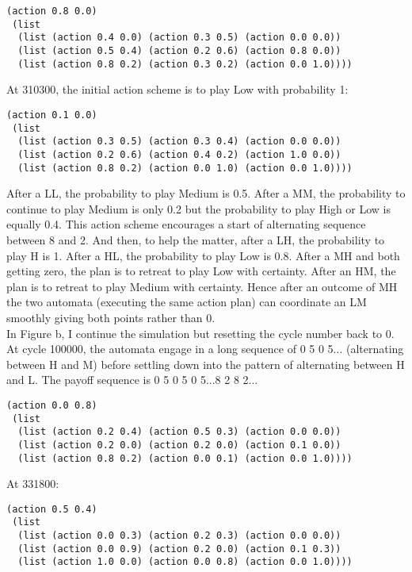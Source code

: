 \documentclass[12.5pt]{report}
\begin{document}
\begin{verbatim}
(action 0.8 0.0)
 (list
  (list (action 0.4 0.0) (action 0.3 0.5) (action 0.0 0.0))
  (list (action 0.5 0.4) (action 0.2 0.6) (action 0.8 0.0))
  (list (action 0.8 0.2) (action 0.3 0.2) (action 0.0 1.0))))
\end{verbatim}

At 310300, the initial action scheme is to play Low with probability 1:

\begin{verbatim}
(action 0.1 0.0)
 (list
  (list (action 0.3 0.5) (action 0.3 0.4) (action 0.0 0.0))
  (list (action 0.2 0.6) (action 0.4 0.2) (action 1.0 0.0))
  (list (action 0.8 0.2) (action 0.0 1.0) (action 0.0 1.0))))

\end{verbatim}
After a LL, the probability to play Medium is 0.5. After a MM, the probability to continue to play Medium is only 0.2 but the probability to play High or Low is equally 0.4. This action scheme encourages a start of alternating sequence between 8 and 2. And then, to help the matter, after a LH, the probability to play H is 1. After a HL, the probability to play Low is 0.8. After a MH and both getting zero, the plan is to retreat to play Low with certainty. After an HM, the plan is to retreat to play Medium with certainty. Hence after an outcome of MH the two automata (executing the same action plan) can coordinate an LM smoothly giving both points rather than 0.\\

In Figure b, I continue the simulation but resetting the cycle number back to 0. At cycle 100000, the automata engage in a long sequence of 0 5 0 5... (alternating between H and M) before settling down into the pattern of alternating between H and L. The payoff sequence is 0 5 0 5 0 5...8 2 8 2...\\

\begin{verbatim}
(action 0.0 0.8)
 (list
  (list (action 0.2 0.4) (action 0.5 0.3) (action 0.0 0.0))
  (list (action 0.2 0.0) (action 0.2 0.0) (action 0.1 0.0))
  (list (action 0.8 0.2) (action 0.0 0.1) (action 0.0 1.0))))
\end{verbatim}



At 331800:
\begin{verbatim}
(action 0.5 0.4)
 (list
  (list (action 0.0 0.3) (action 0.2 0.3) (action 0.0 0.0))
  (list (action 0.0 0.9) (action 0.2 0.0) (action 0.1 0.3))
  (list (action 1.0 0.0) (action 0.0 0.8) (action 0.0 1.0))))
\end{verbatim}
\end{document}
